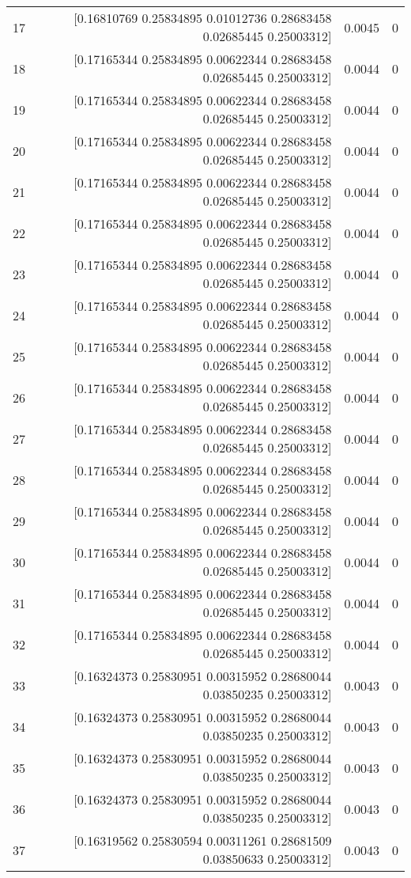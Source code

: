 \begin{longtable}{lrrr}
17 & [0.16810769 0.25834895 0.01012736 0.28683458 0.02685445 0.25003312] & 0.0045 & 0 \\
18 & [0.17165344 0.25834895 0.00622344 0.28683458 0.02685445 0.25003312] & 0.0044 & 0 \\
19 & [0.17165344 0.25834895 0.00622344 0.28683458 0.02685445 0.25003312] & 0.0044 & 0 \\
20 & [0.17165344 0.25834895 0.00622344 0.28683458 0.02685445 0.25003312] & 0.0044 & 0 \\
21 & [0.17165344 0.25834895 0.00622344 0.28683458 0.02685445 0.25003312] & 0.0044 & 0 \\
22 & [0.17165344 0.25834895 0.00622344 0.28683458 0.02685445 0.25003312] & 0.0044 & 0 \\
23 & [0.17165344 0.25834895 0.00622344 0.28683458 0.02685445 0.25003312] & 0.0044 & 0 \\
24 & [0.17165344 0.25834895 0.00622344 0.28683458 0.02685445 0.25003312] & 0.0044 & 0 \\
25 & [0.17165344 0.25834895 0.00622344 0.28683458 0.02685445 0.25003312] & 0.0044 & 0 \\
26 & [0.17165344 0.25834895 0.00622344 0.28683458 0.02685445 0.25003312] & 0.0044 & 0 \\
27 & [0.17165344 0.25834895 0.00622344 0.28683458 0.02685445 0.25003312] & 0.0044 & 0 \\
28 & [0.17165344 0.25834895 0.00622344 0.28683458 0.02685445 0.25003312] & 0.0044 & 0 \\
29 & [0.17165344 0.25834895 0.00622344 0.28683458 0.02685445 0.25003312] & 0.0044 & 0 \\
30 & [0.17165344 0.25834895 0.00622344 0.28683458 0.02685445 0.25003312] & 0.0044 & 0 \\
31 & [0.17165344 0.25834895 0.00622344 0.28683458 0.02685445 0.25003312] & 0.0044 & 0 \\
32 & [0.17165344 0.25834895 0.00622344 0.28683458 0.02685445 0.25003312] & 0.0044 & 0 \\
33 & [0.16324373 0.25830951 0.00315952 0.28680044 0.03850235 0.25003312] & 0.0043 & 0 \\
34 & [0.16324373 0.25830951 0.00315952 0.28680044 0.03850235 0.25003312] & 0.0043 & 0 \\
35 & [0.16324373 0.25830951 0.00315952 0.28680044 0.03850235 0.25003312] & 0.0043 & 0 \\
36 & [0.16324373 0.25830951 0.00315952 0.28680044 0.03850235 0.25003312] & 0.0043 & 0 \\
37 & [0.16319562 0.25830594 0.00311261 0.28681509 0.03850633 0.25003312] & 0.0043 & 0 \\

\end{longtable}
